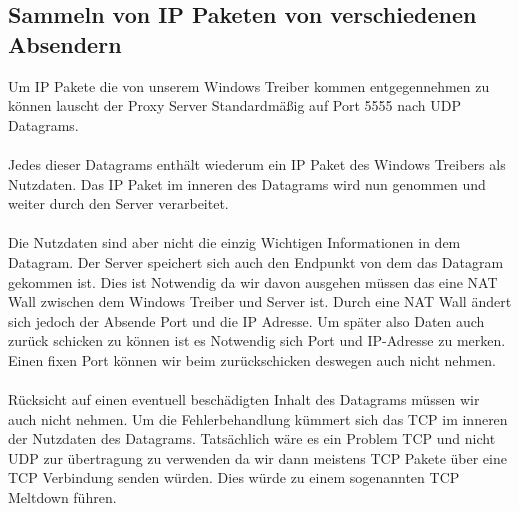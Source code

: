 \subsection{Sammeln von IP Paketen von verschiedenen Absendern}
Um IP Pakete die von unserem Windows Treiber kommen entgegennehmen zu können lauscht der Proxy Server Standardmäßig auf Port 5555 nach UDP Datagrams. 
\\\\
Jedes dieser Datagrams enthält wiederum ein IP Paket des Windows Treibers als Nutzdaten. Das IP Paket im inneren des Datagrams wird nun genommen und weiter durch den Server verarbeitet.
\\\\
Die Nutzdaten sind aber nicht die einzig Wichtigen Informationen in dem Datagram. Der Server speichert sich auch den Endpunkt von dem das Datagram gekommen ist. Dies ist Notwendig da wir davon ausgehen müssen das eine NAT Wall zwischen dem Windows Treiber und Server ist. Durch eine NAT Wall ändert sich jedoch der Absende Port und die IP Adresse. Um später also Daten auch zurück schicken zu können ist es Notwendig sich Port und IP-Adresse zu merken. Einen fixen Port können wir beim zurückschicken deswegen auch nicht nehmen.
\\\\ 
Rücksicht auf einen eventuell beschädigten Inhalt des Datagrams müssen wir auch nicht nehmen. Um die Fehlerbehandlung kümmert sich das TCP im inneren der Nutzdaten des Datagrams. Tatsächlich wäre es ein Problem TCP und nicht UDP zur übertragung zu verwenden da wir dann meistens TCP Pakete über eine TCP Verbindung senden würden. Dies würde zu einem sogenannten TCP Meltdown führen.

